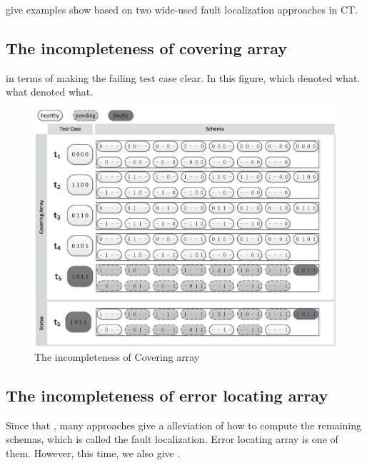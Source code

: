 give examples show based on two wide-used fault localization approaches in CT.

\subsection{The incompleteness of covering array}

in terms of making the failing test case clear. In this figure, which denoted what. what denoted what. 


\begin{figure}[ht]
 \centering
 \includegraphics[width=5.6in]{ca.eps}
 \caption{The incompleteness of Covering array }
 \label{fig_inc_ca}
\end{figure}




\subsection{The incompleteness of error locating array}
Since that , many approaches give a alleviation of how to compute the remaining schemas, which is called the fault localization. Error locating array is one of them. However, this time, we also give .

